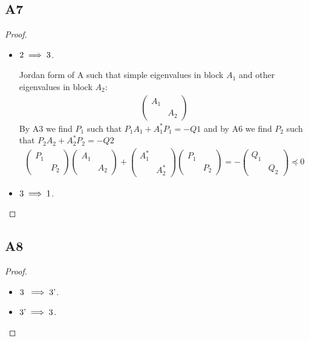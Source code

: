 \documentclass[11pt]{article}
\begin{document}
\subsection*{A7}
\begin{proof}\leavevmode
\begin{itemize}
	\item \(\textnormal{2} \implies \textnormal{3}\).
	
	Jordan form of A such that simple eigenvalues in block $A_1$ and other eigenvalues in block $A_2$:
	\begin{align*}
	\begin{pmatrix}
	A_1 & \\
	& A_2
	\end{pmatrix}
	\end{align*}
	By A3 we find $P_1$ such that $P_1A_1+A_1^*P_1=-Q1$ and by A6 we find $P_2$ such that $P_2A_2+A_2^*P_2=-Q2$
	\begin{align*}
	\begin{pmatrix}
	P_1 & \\
	& P_2
	\end{pmatrix}
	\begin{pmatrix}
	A_1 & \\
	& A_2
	\end{pmatrix}
	+
	\begin{pmatrix}
	A_1^* & \\
	& A_2^*
	\end{pmatrix}
	\begin{pmatrix}
	P_1 & \\
	& P_2
	\end{pmatrix}=-
	\begin{pmatrix}
	Q_1 & \\
	& Q_2
	\end{pmatrix}\preceq 0
	\end{align*}
	\item \(\textnormal{3} \implies \textnormal{1}\).
	
	\qedhere
\end{itemize}
\end{proof}

\subsection*{A8}
\begin{proof}\leavevmode
\begin{itemize}
	\item \(\textnormal{3}\hphantom{'} \implies \textnormal{3'}\).
	
	\item \(\textnormal{3'} \implies \textnormal{3}\).
	
	\qedhere
\end{itemize}
\end{proof}
\end{document}
